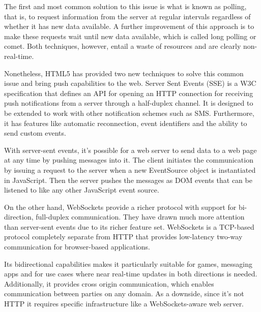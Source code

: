 The first and most common solution to this issue is what is known as polling, that is, to request information from the server at regular intervals regardless of whether it has new data available. A further improvement of this approach is to make these requests wait until new data available, which is called long polling or comet. Both techniques, however, entail a waste of resources and are clearly non-real-time.

Nonetheless, HTML5 has provided two new techniques to solve this common issue and bring push capabilities to the web. Server Sent Events (SSE) is a W3C specification \cite{SSE} that defines an API for opening an HTTP connection for receiving push notifications from a server through a half-duplex channel. It is designed to be extended to work with other notification schemes such as SMS. Furthermore, it has features like automatic reconnection, event identifiers and the ability to send custom events.

With server-sent events, it's possible for a web server to send data to a web page at any time by pushing messages into it. The client initiates the communication by issuing a request to the server when a new EventSource object is instantiated in JavaScript. Then the server pushes the messages as DOM events that can be listened to like any other JavaScript event source.

On the other hand, WebSockets provide a richer protocol with support for bi-direction, full-duplex communication. They have drawn much more attention than server-sent events due to its richer feature set. WebSockets is a TCP-based protocol \cite{WS} completely separate from HTTP that provides low-latency two-way communication for browser-based applications.

Its bidirectional capabilities makes it particularly suitable for games, messaging apps and for use cases where near real-time updates in both directions is needed. Additionally, it provides cross origin communication, which enables communication between parties on any domain. As a downside, since it's not HTTP it requires specific infrastructure like a WebSockets-aware web server.

